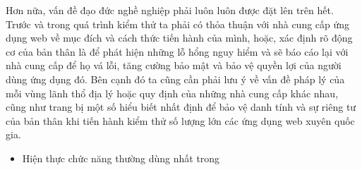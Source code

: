 Hơn nữa, vấn đề đạo đức nghề nghiệp phải luôn luôn được đặt lên trên hết. Trước và trong quá trình kiểm thử ta phải có thỏa thuận với nhà cung cấp ứng dụng web về mục đích và cách thức tiến hành của mình, hoặc, xác định rõ động cơ của bản thân là để phát hiện những lỗ hổng nguy hiểm và sẽ báo cáo lại với nhà cung cấp để họ vá lỗi, tăng cường bảo mật và bảo vệ quyền lợi của người dùng ứng dụng đó. Bên cạnh đó ta cũng cần phải lưu ý về vấn đề pháp lý của mỗi vùng lãnh thổ địa lý hoặc quy định của những nhà cung cấp khác nhau, cũng như trang bị một số hiểu biết nhất định để bảo vệ danh tính và sự riêng tư của bản thân khi tiến hành kiểm thử số lượng lớn các ứng dụng web xuyên quốc gia.\par

\begin{itemize}
    \item Hiện thực chức năng thường dùng nhất trong 
\end{itemize}


